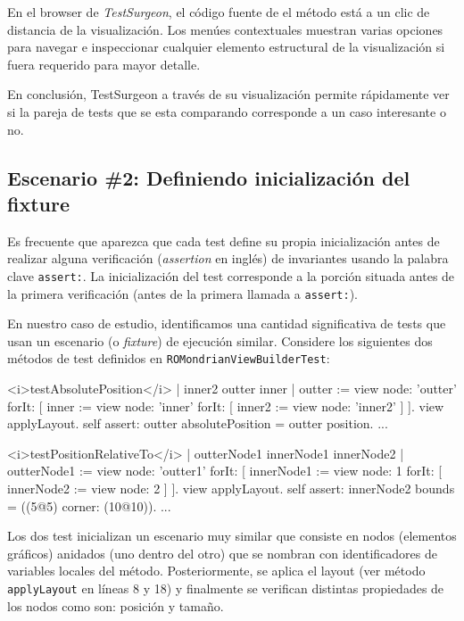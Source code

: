 \par En el browser de \emph{TestSurgeon}, el código fuente de el método está a un clic de distancia de la visualización. Los menúes contextuales muestran varias opciones para navegar e inspeccionar cualquier elemento estructural de la visualización si fuera requerido para mayor detalle.


\par En conclusión, TestSurgeon a través de su visualización permite rápidamente ver si la pareja de tests que se esta comparando corresponde a un caso interesante o no.

\newpage
\subsection{Escenario \#2: Definiendo inicialización del fixture}

\par Es frecuente que aparezca que cada test define su propia inicialización antes de realizar alguna verificación (\emph{assertion} en inglés) de invariantes usando la palabra clave {\tt assert:}. La inicialización del test corresponde a la porción situada antes de la primera verificación (\ie antes de la primera llamada a {\tt assert:}).

\par En nuestro caso de estudio, identificamos una cantidad significativa de tests que usan un escenario (o \emph{fixture}) de ejecución similar. Considere los siguientes dos métodos de test definidos en {\tt ROMondrianViewBuilderTest}:

\begin{codeWithLineNumbers}
<i>testAbsolutePosition</i>
	| inner2 outter inner |
	outter := view node: 'outter' forIt: [
		inner := view node: 'inner' forIt: [
			inner2 := view node: 'inner2'
		]
	].
	view applyLayout.
	self assert: outter absolutePosition = outter position.
	...


<i>testPositionRelativeTo</i>
	| outterNode1 innerNode1 innerNode2 |
	outterNode1 := view node: 'outter1' forIt: 
		[ innerNode1 := view node: 1 forIt: [ 
		innerNode2 := view node: 2 ] ].
	view applyLayout.
	self assert: innerNode2 bounds = ((5@5) corner: (10@10)).
	...
\end{codeWithLineNumbers}

\par Los dos test inicializan un escenario muy similar que consiste en nodos (elementos gráficos) anidados (uno dentro del otro) que se nombran con identificadores de variables locales del método. Posteriormente, se aplica el layout (ver método {\tt applyLayout} en líneas 8 y 18) y finalmente se verifican distintas propiedades de los nodos como son: posición y tamaño.

